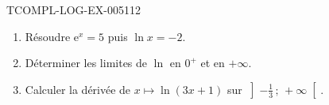 \begin{exercice}{TCOMPL-LOG-EX-005}{1}{12}
\begin{enumerate}
  \item Résoudre $\mathrm{e}^{x}=5$ puis $\ln x=-2$.
  \item Déterminer les limites de $\ln$ en $0^+$ et en $+\infty$.
  \item Calculer la dérivée de $x\mapsto\ln(3x+1)$ sur
        $\left]-\tfrac13\,;\,+\infty\right[$.
\end{enumerate}
\end{exercice}
